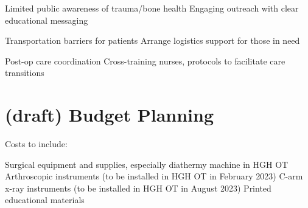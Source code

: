\documentclass{article}
\begin{document}
\begin{outline}





\1 Limited public awareness of trauma/bone health
\2 Engaging outreach with clear educational messaging

\1 Transportation barriers for patients
\2 Arrange logistics support for those in need

\1 Post-op care coordination
\2 Cross-training nurses, protocols to facilitate care transitions


\end{outline}



\clearpage

\section{(draft) Budget Planning}
Costs to include:
\begin{outline}
\1 Surgical equipment and supplies, especially diathermy machine in HGH OT
\1 Arthroscopic instruments (to be installed in HGH OT in February 2023)
\1 C-arm x-ray instruments (to be installed in HGH OT in August 2023)
\1 Printed educational materials
\end{outline}




\end{document}

